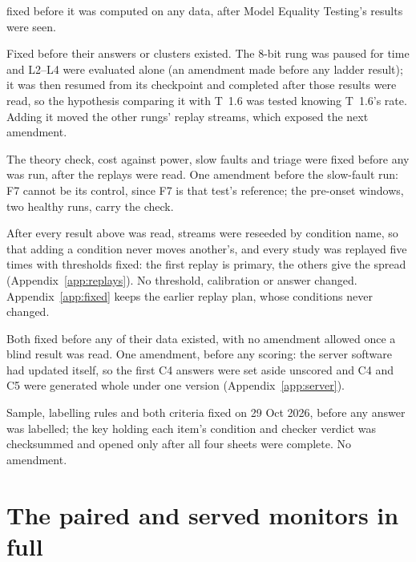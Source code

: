 \documentclass{article}
\begin{document}
\begin{description}[leftmargin=0pt,itemsep=2pt,font=\normalfont\itshape]
  fixed before it was computed on any data, after Model Equality Testing's results
  were seen.
  \item[Fault ladder and real-traffic topics.] Fixed before their answers or
  clusters existed. The 8-bit rung was paused for time and L2--L4 were
  evaluated alone (an amendment made before any ladder result); it was then
  resumed from its checkpoint and completed after those results were read, so
  the hypothesis comparing it with T~1.6 was tested knowing T~1.6's rate.
  Adding it moved the other rungs' replay streams, which exposed the next
  amendment.
  \item[Served-answer follow-ups.] The theory check, cost against power, slow
  faults and triage were fixed before any was run, after the replays were read.
  One amendment before the slow-fault run: F7 cannot be its control, since F7 is
  that test's reference; the pre-onset windows, two healthy runs, carry the check.
  \item[Replay seeding.] After every result above was read, streams were reseeded
  by condition name, so that adding a condition never moves another's, and every
  study was replayed five times with thresholds fixed: the first replay is
  primary, the others give the spread (Appendix~\ref{app:replays}). No threshold,
  calibration or answer changed. Appendix~\ref{app:fixed} keeps the earlier
  replay plan, whose conditions never changed.
  \item[Hybrid test and blind study.] Both fixed before any of their data existed,
  with no amendment allowed once a blind result was read. One amendment, before any
  scoring: the server software had updated itself, so the first C4 answers were set
  aside unscored and C4 and C5 were generated whole under one version
  (Appendix~\ref{app:server}).
  \item[Hand-label check.] Sample, labelling rules and both criteria fixed on
  29 Oct 2026, before any answer was labelled; the key holding each item's
  condition and checker verdict was checksummed and opened only after all four
  sheets were complete. No amendment.
\end{description}

\section{The paired and served monitors in full}
\label{app:paired}
\end{document}
